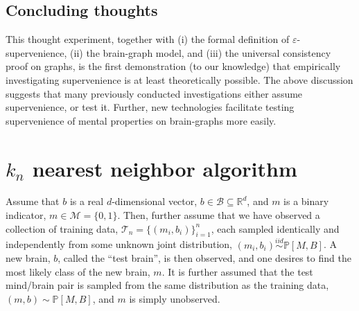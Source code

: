 \documentclass{article}
\newcommand{\PP}{\mathbb{P}}           %
\newcommand{\Real}{\mathbb{R}}           %
\providecommand{\mc}[1]{\mathcal{#1}}
\begin{document}

\subsection{Concluding thoughts} %
\label{par:concluding_thoughts}


This thought experiment, together with (i) the formal definition of $\varepsilon$-supervenience, (ii) the brain-graph model, and (iii) the universal consistency proof on graphs, is the first demonstration (to our knowledge) that empirically investigating supervenience is at least theoretically possible. The above discussion suggests that many previously conducted investigations either assume supervenience, or test it.  Further, new technologies facilitate testing supervenience of mental properties on brain-graphs more easily.



\appendix
\section{$k_n$ nearest neighbor algorithm} %
\label{app:knn}


Assume that $b$ is a real $d$-dimensional vector, $b \in \mc{B} \subseteq \Real^d$, and $m$ is a binary indicator, $m \in \mc{M} = \{0,1\}$.  Then, further assume that we have observed a collection of training data, $\mc{T}_n =\{(m_i,b_i)\}_{i=1}^n$, each sampled identically and independently from some unknown joint distribution, $(m_i,b_i)\overset{iid}{\sim} \PP[M,B]$.  A new brain, $b$, called the ``test brain'', is then observed, and one desires to find the most likely class of the new brain, $m$.  It is further assumed that the test mind/brain pair is sampled from the same distribution as the training data, $(m,b)\sim \PP[M,B]$, and $m$ is simply unobserved.

\end{document}
